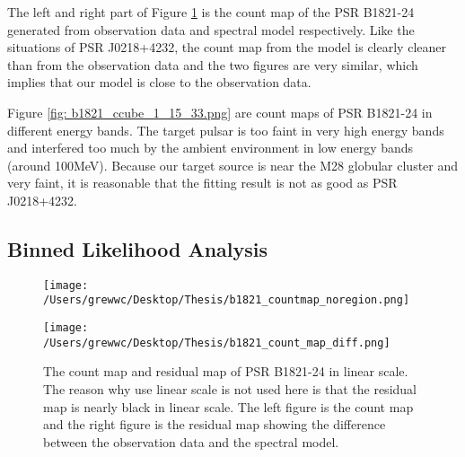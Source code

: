 \documentclass[12pt]{report}
\begin{document}
              The left and right part of Figure \ref{fig: b1821_count_map_diff.png} is the count 
              map of the PSR B1821-24 generated from observation data and spectral model respectively. 
              Like the situations of PSR J0218+4232, the count map from the model is clearly cleaner than 
              from the observation data and the two figures are very similar, which implies that our model 
              is close to the observation data. 

              Figure \ref{fig: b1821_ccube_1_15_33.png} are count maps of PSR B1821-24 in 
              different energy bands. The target pulsar is too faint in very high energy bands 
              and interfered too much by the ambient environment in low energy bands 
              (around 100MeV). Because our target source is near the M28 globular cluster and 
              very faint, it is reasonable that the fitting result is not as good as 
              PSR J0218+4232. 
              \subsection{Binned Likelihood Analysis}
              \begin{figure}[!ht]
                \begin{center}
                \begin{minipage}{0.45\textwidth}
                  \begin{center} 
                    \texttt{[image: /Users/grewwc/Desktop/Thesis/b1821\_countmap\_noregion.png]}
                  \end{center}
                \end{minipage}
                \begin{minipage}{0.45\textwidth}
                  \begin{center}
                    \texttt{[image: /Users/grewwc/Desktop/Thesis/b1821\_count\_map\_diff.png]}
                  \end{center}
                \end{minipage}
              \end{center}
              \caption{The count map and residual map of PSR B1821-24 in linear scale. 
                The reason why use linear scale is not used here is that the residual map is 
                nearly black in linear scale. The \textsf{left} figure is the count map and the 
                \textsf{right} figure is the residual map showing the difference between the 
                observation data and the spectral model.}
              \label{fig: b1821_count_map_diff.png}
            \end{figure}
\end{document}
